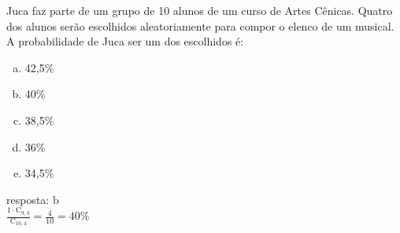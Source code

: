 \begin{ex}
Juca faz parte de um grupo de 10 alunos de um curso de Artes Cênicas. Quatro dos alunos serão escolhidos aleatoriamente para compor o elenco de um musical. A probabilidade de Juca ser um dos escolhidos é:
   \begin{enumerate}[(a)]
   \item 42,5\%
   \item 40\%
   \item 38,5\%
   \item 36\%
   \item 34,5\%
   \end{enumerate}
    \begin{sol}
      resposta: b \\
      $\frac{1\cdot\mathrm{C}_{9,3}}{\mathrm{C}_{{10},4}}=\frac{4}{10}=40\%$
    \end{sol}
\end{ex}